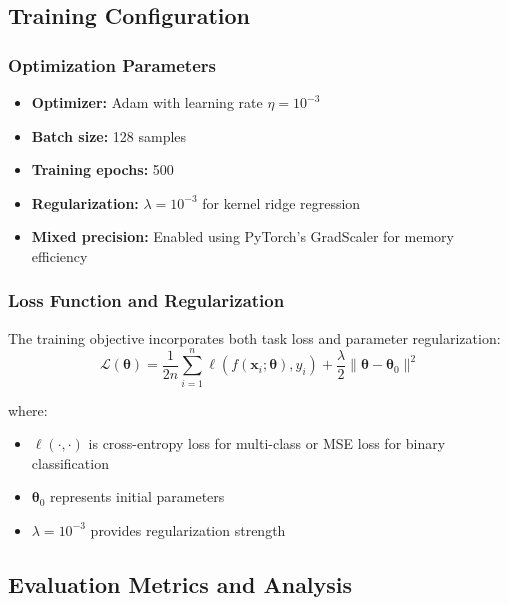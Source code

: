 \documentclass{article}
\theoremstyle{plain}
\theoremstyle{definition}
\theoremstyle{remark}
\begin{document}
\subsection{Training Configuration}

\subsubsection{Optimization Parameters}
\begin{itemize}
\item \textbf{Optimizer:} Adam with learning rate $\eta = 10^{-3}$
\item \textbf{Batch size:} 128 samples
\item \textbf{Training epochs:} 500
\item \textbf{Regularization:} $\lambda = 10^{-3}$ for kernel ridge regression
\item \textbf{Mixed precision:} Enabled using PyTorch's GradScaler for memory efficiency
\end{itemize}

\subsubsection{Loss Function and Regularization}
The training objective incorporates both task loss and parameter regularization:
$$\mathcal{L}(\boldsymbol{\theta}) = \frac{1}{2n} \sum_{i=1}^n \ell(f(\mathbf{x}_i; \boldsymbol{\theta}), y_i) + \frac{\lambda}{2} \|\boldsymbol{\theta} - \boldsymbol{\theta}_0\|^2$$

where:
\begin{itemize}
\item $\ell(\cdot, \cdot)$ is cross-entropy loss for multi-class or MSE loss for binary classification
\item $\boldsymbol{\theta}_0$ represents initial parameters
\item $\lambda = 10^{-3}$ provides regularization strength
\end{itemize}

\subsection{Evaluation Metrics and Analysis}
\end{document}
